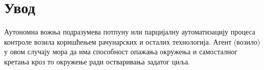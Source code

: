 \documentclass[11pt,oneside]{memoir}
\begin{document}
\frontmatter
\naslovna
\komisija
\apstrakt
\tableofcontents*

\mainmatter

\chapter{Увод}

Аутономна вожња подразумева потпуну или парцијалну аутоматизацију процеса контроле возила коришћењем рачунарских и осталих технологија. Агент (возило) 
у овом случају мора да има способност опажања окружења и самосталног кретања кроз то окружење ради остваривања задатог циља.
\end{document}
